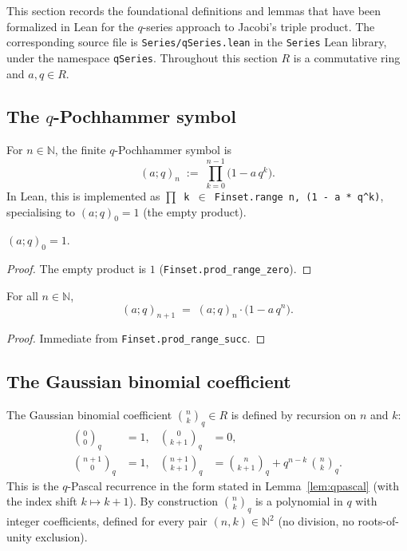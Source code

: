 This section records the foundational definitions and lemmas that have been
formalized in Lean for the $q$-series approach to Jacobi's triple product.
The corresponding source file is \texttt{Series/qSeries.lean} in the
\texttt{Series} Lean library, under the namespace \texttt{qSeries}.
Throughout this section $R$ is a commutative ring and $a, q \in R$.

\subsection{The $q$-Pochhammer symbol}

\begin{definition}\label{def:qPochhammer}\leanok
For $n \in \mathbb{N}$, the finite $q$-Pochhammer symbol is
\[
  (a; q)_n \;:=\; \prod_{k = 0}^{n - 1} \bigl(1 - a\, q^k\bigr).
\]
In Lean, this is implemented as \texttt{$\prod$ k $\in$ Finset.range n, (1 - a * q\^{}k)},
specialising to $(a; q)_0 = 1$ (the empty product).
\end{definition}

\begin{lemma}\label{lem:qPochhammer-zero}\leanok{}
$(a; q)_0 = 1$.
\end{lemma}

\begin{proof}\leanok
The empty product is $1$ (\texttt{Finset.prod\_range\_zero}).
\end{proof}

\begin{lemma}[Recurrence]\label{lem:qPochhammer-succ}\leanok{}
For all $n \in \mathbb{N}$,
\[
  (a; q)_{n+1} \;=\; (a; q)_n \cdot \bigl(1 - a\, q^n\bigr).
\]
\end{lemma}

\begin{proof}\leanok
Immediate from \texttt{Finset.prod\_range\_succ}.
\end{proof}

\subsection{The Gaussian binomial coefficient}

\begin{definition}\label{def:qBinom}\leanok
The Gaussian binomial coefficient $\binom{n}{k}_q \in R$ is defined by
recursion on $n$ and $k$:
\[
\begin{aligned}
  \binom{0}{0}_q &= 1,
  & \binom{0}{k+1}_q &= 0, \\
  \binom{n+1}{0}_q &= 1,
  & \binom{n+1}{k+1}_q &= \binom{n}{k+1}_q + q^{n-k}\,\binom{n}{k}_q.
\end{aligned}
\]
This is the $q$-Pascal recurrence in the form stated in
Lemma~\ref{lem:qpascal} (with the index shift $k \mapsto k+1$). By
construction $\binom{n}{k}_q$ is a polynomial in $q$ with integer
coefficients, defined for every pair $(n, k) \in \mathbb{N}^2$ (no
division, no roots-of-unity exclusion).
\end{definition}

